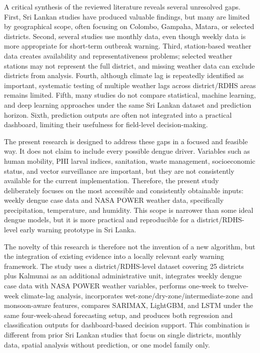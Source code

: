 \documentclass[12pt,a4paper]{article}
\begin{document}
A critical synthesis of the reviewed literature reveals several unresolved gaps. First, Sri Lankan studies have produced valuable findings, but many are limited by geographical scope, often focusing on Colombo, Gampaha, Matara, or selected districts. Second, several studies use monthly data, even though weekly data is more appropriate for short-term outbreak warning. Third, station-based weather data creates availability and representativeness problems; selected weather stations may not represent the full district, and missing weather data can exclude districts from analysis. Fourth, although climate lag is repeatedly identified as important, systematic testing of multiple weather lags across district/RDHS areas remains limited. Fifth, many studies do not compare statistical, machine learning, and deep learning approaches under the same Sri Lankan dataset and prediction horizon. Sixth, prediction outputs are often not integrated into a practical dashboard, limiting their usefulness for field-level decision-making.

The present research is designed to address these gaps in a focused and feasible way. It does not claim to include every possible dengue driver. Variables such as human mobility, PHI larval indices, sanitation, waste management, socioeconomic status, and vector surveillance are important, but they are not consistently available for the current implementation. Therefore, the present study deliberately focuses on the most accessible and consistently obtainable inputs: weekly dengue case data and NASA POWER weather data, specifically precipitation, temperature, and humidity. This scope is narrower than some ideal dengue models, but it is more practical and reproducible for a district/RDHS-level early warning prototype in Sri Lanka.

The novelty of this research is therefore not the invention of a new algorithm, but the integration of existing evidence into a locally relevant early warning framework. The study uses a district/RDHS-level dataset covering 25 districts plus Kalmunai as an additional administrative unit, integrates weekly dengue case data with NASA POWER weather variables, performs one-week to twelve-week climate-lag analysis, incorporates wet-zone/dry-zone/intermediate-zone and monsoon-aware features, compares SARIMAX, LightGBM, and LSTM under the same four-week-ahead forecasting setup, and produces both regression and classification outputs for dashboard-based decision support. This combination is different from prior Sri Lankan studies that focus on single districts, monthly data, spatial analysis without prediction, or one model family only.
\end{document}

